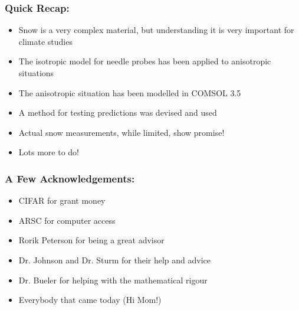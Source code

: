 \documentclass{beamer}
\begin{document}
\begin{frame}
\frametitle{Quick Recap:}
\begin{itemize}
\item Snow is a very complex material, but understanding it is very important for climate studies
\item The isotropic model for needle probes has been applied to anisotropic situations
\item The anisotropic situation has been modelled in COMSOL 3.5
\item A method for testing predictions was devised and used
\item Actual snow measurements, while limited, show promise!
\item Lots more to do!
\end{itemize}
\end{frame}


\begin{frame}
\frametitle{A Few Acknowledgements:}
\begin{itemize}
\item CIFAR for grant money
\item ARSC for computer access
\item Rorik Peterson for being a great advisor
\item Dr. Johnson and Dr. Sturm for their help and advice
\item Dr. Bueler for helping with the mathematical rigour
\item Everybody that came today (Hi Mom!)
\end{itemize}
\end{frame}
\end{document}
